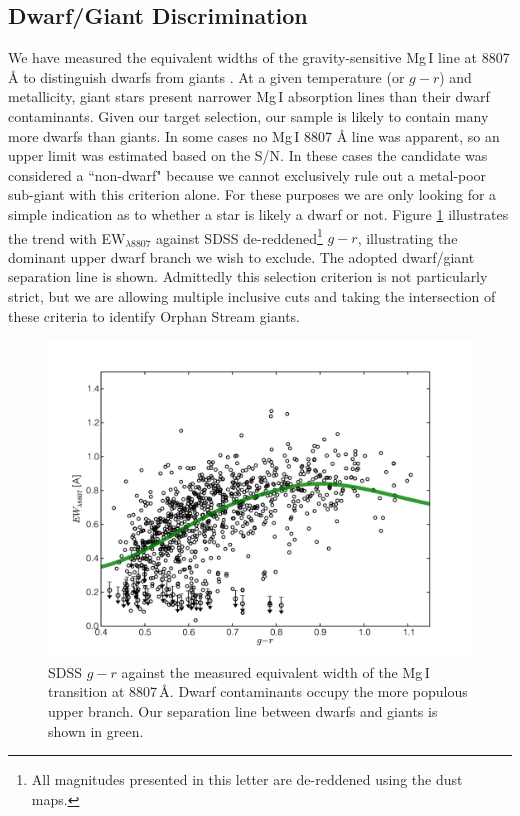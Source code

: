 \documentclass{emulateapj}
\begin{document}
\subsection{Dwarf/Giant Discrimination}
\label{sec:dwarf-giant}

We have measured the equivalent widths of the gravity-sensitive Mg\,\textsc{I} line at 8807 \AA{} to distinguish dwarfs from giants \citep{Battaglia;Starkenburg_2012}. At a given temperature (or $g - r$) and metallicity, giant stars present narrower Mg\,\textsc{I} absorption lines than their dwarf contaminants. Given our target selection, our sample is likely to contain many more dwarfs than giants. In some cases no Mg\,\textsc{I} 8807 \AA{} line was apparent, so an upper limit was estimated based on the S/N. In these cases the candidate was considered a ``non-dwarf" because we cannot exclusively rule out a metal-poor sub-giant with this criterion alone. For these purposes we are only looking for a simple indication as to whether a star is likely a dwarf or not. Figure \ref{fig:ew-mg} illustrates the trend with EW$_{\lambda8807}$ against SDSS de-reddened\footnote{All magnitudes presented in this letter are de-reddened using the \citet{Schlegel;Finkbeiner;Davis_1998} dust maps.} $g - r$, illustrating the dominant upper dwarf branch we wish to exclude. The adopted dwarf/giant separation line is shown. Admittedly this selection criterion is not particularly strict, but we are allowing multiple inclusive cuts and taking the intersection of these criteria to identify Orphan Stream giants.

\begin{figure}[h]
	\includegraphics[width=\columnwidth]{./figures/ew-mg.pdf}
	\caption{SDSS $g - r$ against the measured equivalent width of the Mg\,\textsc{I} transition at 8807\,\AA{}. Dwarf contaminants occupy the more populous upper branch. Our separation line between dwarfs and giants is shown in green.}
	\label{fig:ew-mg}
\end{figure}
\end{document}
